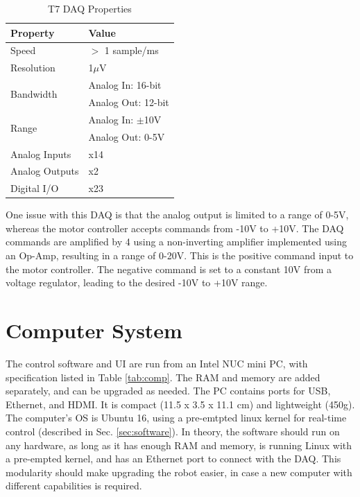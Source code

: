 \documentclass[12pt]{report}
\begin{document}
		
	\begin{table}[h]
	\centering
	\caption{T7 DAQ Properties}	
	\begin{tabular}{|l|l|}
		\hline
		\rowcolor{gray!10} \textbf{Property} & \textbf{Value}  \\ \hline
 		Speed & $>$ 1 sample/ms \\ \hline
 		Resolution& 1$\mu $V \\ \hline
 		 \multirow{2}{*}{Bandwidth} & Analog In: 16-bit \\
 		 & Analog Out: 12-bit \\ \hline
 		 \multirow{2}{*}{Range} & Analog In: $\pm $10V \\
 		 & Analog Out: 0-5V \\ \hline
 		 Analog Inputs & x14 \\ \hline
 		 Analog Outputs & x2 \\ \hline
 		 Digital I/O  & x23 \\ \hline
		\end{tabular}
	\label{tab:T7}
	\end{table}
	
	One issue with this DAQ is that the analog output is limited to a range of 0-5V, whereas the motor controller accepts commands from -10V to +10V. The DAQ commands are amplified by 4 using a non-inverting amplifier implemented using an Op-Amp, resulting in a range of 0-20V. This is the positive command input to the motor controller. The negative command is set to a constant 10V from a voltage regulator, leading to the desired -10V to +10V range. 
	


	\section{Computer System}

	The control software and UI are run from an Intel NUC mini PC, with specification listed in Table \ref{tab:comp}. The RAM and memory are added separately, and can be upgraded as needed. The PC contains ports for USB, Ethernet, and HDMI. It is compact (11.5 x 3.5 x 11.1 cm) and lightweight (450g). The computer's OS is Ubuntu 16, using a pre-emtpted linux kernel for real-time control (described in Sec. \ref{sec:software}). In theory, the software should run on any hardware, as long as it has enough RAM and memory, is running Linux with a pre-empted kernel, and has an Ethernet port to connect with the DAQ. This modularity should make upgrading the robot easier, in case a new computer with different capabilities is required. 
	
\end{document}

